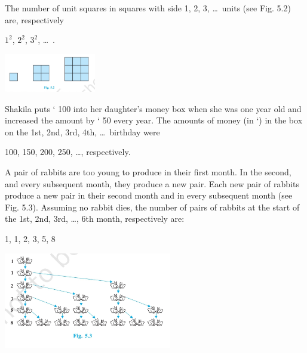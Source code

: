 \documentclass[12pt,a4paper]{book}
\begin{document}
\begin{list}{()}{%
  \setlength{\leftmargin}{20pt}
  \setlength{\itemsep}{15pt}
}

\item The number of unit squares in squares with side 1, 2, 3, \ldots\ units (see Fig. 5.2)
are, respectively
\begin{center}
$1^2$, $2^2$, $3^2$, \ldots\ .
\end{center}

\begin{center}
\includegraphics[width=0.3\textwidth]{Cube.png} 

\end{center}

\item Shakila puts ` 100 into her daughter's money box when she was one year old
and increased the amount by ` 50 every year. The amounts of money (in `) in the
box on the 1st, 2nd, 3rd, 4th, \ldots\ birthday were
\begin{center}
100, 150, 200, 250, \ldots, respectively.
\end{center}

\item A pair of rabbits are too young to produce in their first month. In the second, and
every subsequent month, they produce a new pair. Each new pair of rabbits
produce a new pair in their second month and in every subsequent month (see
Fig. 5.3). Assuming no rabbit dies, the number of pairs of rabbits at the start of
the 1st, 2nd, 3rd, \ldots, 6th month, respectively are:
\begin{center}
1, 1, 2, 3, 5, 8
\end{center}

\begin{center}
\includegraphics[width=0.55\textwidth]{Rabbit.png} 

\end{center}

\end{list}
\end{document}
